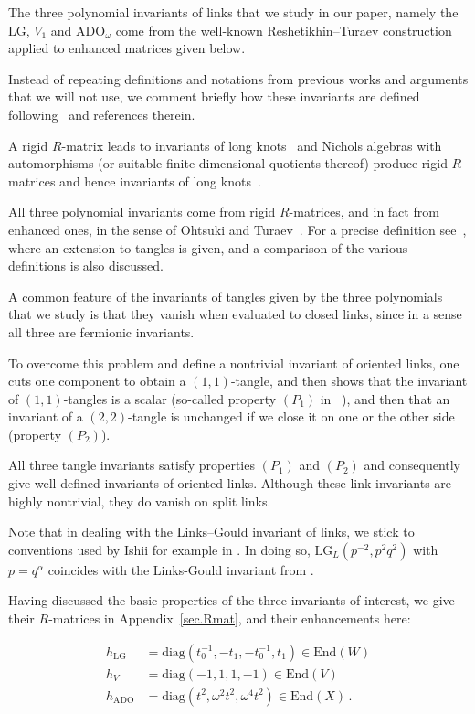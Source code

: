 \documentclass[12pt,reqno]{amsart}
\theoremstyle{definition}
\def\be{\begin{equation}}
\def\ee{\end{equation}}
\def\diag{\mathrm{diag}}
\def\End{\mathrm{End}}
\def\LG{\mathrm{LG}}
\def\ADO{\mathrm{ADO}}
\begin{document}
The three polynomial invariants of links that we study in our paper, namely
the $\LG$, $V_1$ and $\ADO_\omega$ come from the well-known Reshetikhin--Turaev
construction~\cite{RT,Tu:book} applied to enhanced matrices given below.

Instead of repeating definitions and notations from previous works and arguments
that we will not use, we comment briefly how these invariants are defined
following~\cite{GHKST} and references therein. 

A rigid $R$-matrix leads to invariants of long knots~\cite{Kas2}
and Nichols algebras with automorphisms (or suitable finite dimensional quotients
thereof) produce rigid $R$-matrices and hence invariants of long knots~\cite{GK:multi}.

All three polynomial invariants come from rigid $R$-matrices, and in fact from
enhanced ones, in the sense of Ohtsuki and Turaev~\cite{Oht, Tu:YB}.
For a precise definition see~\cite[Sec.2]{GHKST}, 
where an extension to tangles is given, and
a comparison of the various definitions is also discussed.

A common feature of the invariants of tangles given by the three polynomials
that we study is that they vanish when evaluated to closed links, since in a sense
all three are fermionic invariants.

To overcome this problem and define a nontrivial invariant of oriented links,
one cuts one component to obtain a $(1,1)$-tangle, and then shows that the
invariant of $(1,1)$-tangles is a scalar (so-called property $(P_1)$
in ~\cite[Sec.1.1]{GHKST}), and then that an invariant of a $(2,2)$-tangle
is unchanged if we close it on one or the other side (property $(P_2)$). 

All three tangle invariants satisfy properties $(P_1)$ and $(P_2)$ and consequently
give well-defined invariants of oriented links. Although these link invariants are
highly nontrivial, they do vanish on split links. 

Note that in dealing with the Links--Gould invariant of links, we stick to
conventions used by Ishii for example in \cite{Ish}. In doing so,
$\LG_L(p^{-2}, p^{2} q^{2})$ with $p = q^{\alpha}$ coincides with the Links-Gould
invariant from \cite{DWKL}.

Having discussed the basic properties of the three invariants of interest,
we give their $R$-matrices in Appendix~\ref{sec.Rmat}, and their
enhancements here:

\be
\label{3h}
\begin{aligned}
h_{\LG} & =\diag(t_0^{-1}, -t_1, -t_0^{-1}, t_1) \in \End(W) \\
h_{V}   & =\diag(-1, 1, 1, -1) \in \End(V) \\
h_{\ADO} & =\diag(t^2, \omega^2 t^2, \omega^4 t^2) \in \End(X) \,.
\end{aligned}
\ee
\end{document}
